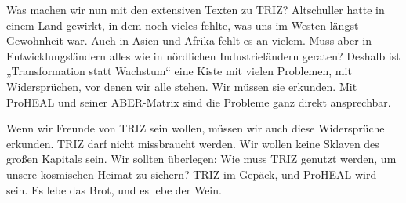 \documentclass[12pt,a4paper]{article}
\begin{document}
Was machen wir nun mit den extensiven Texten zu TRIZ? Altschuller hatte in
einem Land gewirkt, in dem noch vieles fehlte, was uns im Westen längst
Gewohnheit war. Auch in Asien und Afrika fehlt es an vielem. Muss aber in
Entwicklungsländern alles wie in nördlichen Industrieländern geraten?
Deshalb ist „Transformation statt Wachstum“ eine Kiste mit vielen Problemen,
mit Widersprüchen, vor denen wir alle stehen. Wir müssen sie erkunden. Mit
ProHEAL und seiner ABER-Matrix sind die Probleme ganz direkt ansprechbar.

Wenn wir Freunde von TRIZ sein wollen, müssen wir auch diese Widersprüche
erkunden. TRIZ darf nicht missbraucht werden. Wir wollen keine Sklaven des
großen Kapitals sein. Wir sollten überlegen: Wie muss TRIZ genutzt werden, um
unsere kosmischen Heimat zu sichern? TRIZ im Gepäck, und ProHEAL wird sein.  Es
lebe das Brot, und es lebe der Wein.
\ccnotice
\newpage
\end{document}
